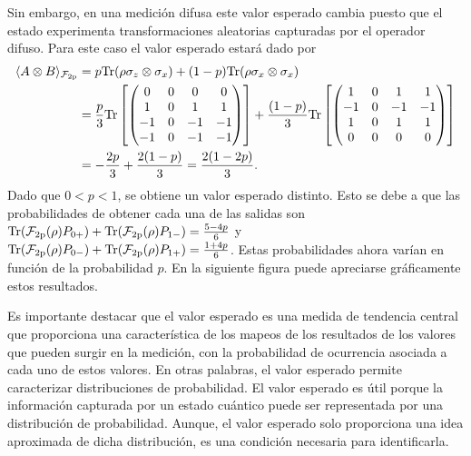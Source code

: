 Sin embargo, en una medición difusa este valor esperado cambia puesto que el estado experimenta transformaciones aleatorias capturadas por el operador difuso. Para este caso el valor esperado estará dado por \[\begin{split}\langle A\otimes B\rangle_{\mathcal{F}_{2\text{p}}}&=p{\rm Tr}(\rho\sigma_z\otimes \sigma_x )+(1-p){\rm Tr}(\rho\sigma_x\otimes \sigma_x )\\
    & =\frac{p}{3}{\rm Tr}\left[ \begin{pmatrix}
        0&0&0&0\\
        1&0&1&1\\
        -1&0&-1&-1\\
        -1&0&-1&-1\\
    \end{pmatrix}\right]+ \frac{(1-p)}{3}{\rm Tr}\left[ \begin{pmatrix}
        1&0&1&1\\
        -1&0&-1&-1\\
        1&0&1&1\\
        0&0&0&0\\
    \end{pmatrix}\right]\\
    &=-\frac{2p}{3}+\frac{2(1-p)}{3}=\frac{2(1-2p)}{3}.
\end{split}\]Dado que $0<p<1$, se obtiene un valor esperado distinto. Esto se debe a que las probabilidades de obtener cada una de las salidas son ${\rm Tr}(\mathcal{F}_{2\text{p}}(\rho)P_{0+})+{\rm Tr}(\mathcal{F}_{2\text{p}}(\rho)P_{1-})=\frac{5-4p}{6}$ y ${\rm Tr}(\mathcal{F}_{2\text{p}}(\rho)P_{0-})+{\rm Tr}(\mathcal{F}_{2\text{p}}(\rho)P_{1+})=\frac{1+4p}{6}$. Estas probabilidades ahora varían en función de la probabilidad $p$. En la siguiente figura puede apreciarse gráficamente estos resultados.










Es importante destacar que el valor esperado es una medida de tendencia central que proporciona una característica de los mapeos de los resultados de los valores que pueden surgir en la medición, con la probabilidad de ocurrencia asociada a cada uno de estos valores. En otras palabras, el valor esperado permite caracterizar distribuciones de probabilidad. El valor esperado es útil porque la información capturada por un estado cuántico puede ser representada por una distribución de probabilidad. Aunque, el valor esperado solo proporciona una idea aproximada de dicha distribución, es una condición necesaria para identificarla. 

